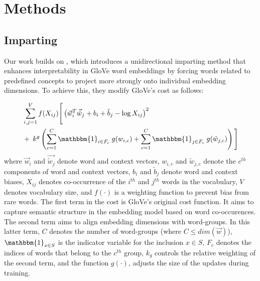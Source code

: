 \documentclass[11pt,a4paper]{article}
\newcommand{\indicator}{\ensuremath{\mathbbm{1}}}
\begin{document}
\section{Methods} \label{sec:methods}

\subsection{Imparting}

Our work builds on \citep{senel20impart}, which introduces a
unidirectional imparting method that
enhances interpretability in GloVe word
embeddings by forcing words related to predefined concepts
to project more strongly onto individual embedding
dimensions.
To achieve this, they modify GloVe's cost as follows:

\begin{align}
\begin{split}
	 &\sum_{i,j=1}^{V} f(X_{ij}) \Bigg[ \left(\vec{w}_i^T\vec{\tilde{w}}_j + b_i + \tilde{b}_j -\log{}X_{ij}\right)^2 \\
	      & +\: k^g\left(\sum_{c=1}^{C} \indicator_{i\in{}F_c} \: g(w_{i,c}) + \sum_{c=1}^{C} \indicator_{j \in F_c} \: g(\tilde{w}_{j,c})  \right) \Bigg] 
\end{split}
\label{eq:glove_uni}
\end{align}
where $\vec{w}_i$ and $\vec{\tilde{w}_j}$ denote word and
context vectors, $w_{i,c}$ and $\tilde{w}_{j,c}$ denote the
$c^{th}$ components of word and context vectors, $b_i$ and
$\tilde{b}_j$ denote word and context biases, $X_{ij}$
denotes co-occurrence of the $i^{th}$ and $j^{th}$ words in
the vocabulary, $V$ denotes vocabulary size, and $f(\cdot)$
is a weighting function to prevent bias from rare words. The
first term in the cost is GloVe's original cost function. It aims to capture semantic structure in the embedding model based on word co-occurences. The second term aims to align embedding dimensions with word-groups. In this latter term, $C$ denotes the number of word-groups (where $C\leq dim(\vec{w})$), $\indicator_{x \in S}$ is the indicator variable for the inclusion ${x \in S}$, $F_c$ denotes the indices of words that belong to the $c^{th}$ group, $k_g$ controls the relative weighting of the second term, and the function $g(\cdot)$, adjusts the size of the updates during training. 
\end{document}
